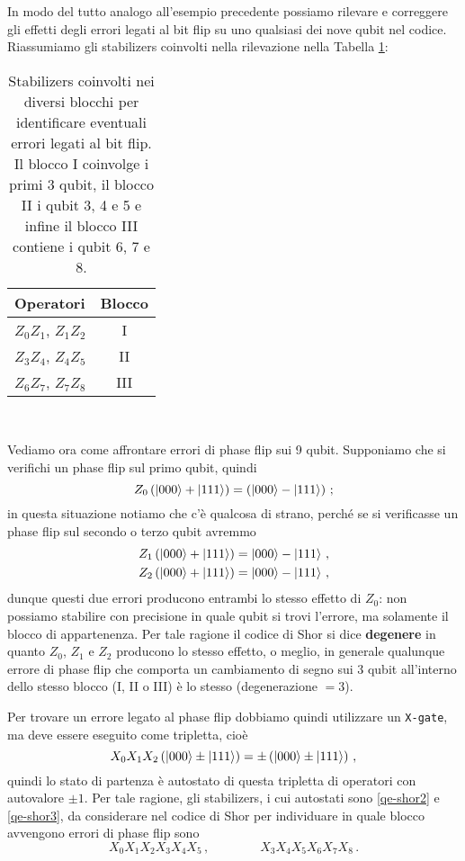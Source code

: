 \noindent In modo del tutto analogo all'esempio precedente possiamo rilevare e correggere gli effetti degli errori legati al bit flip su uno qualsiasi dei nove qubit nel codice. Riassumiamo gli stabilizers coinvolti nella rilevazione nella Tabella \ref{tab:shor-bit-flip-cases}:
\begin{table}[!ht]
	\centering
    \begin{tabular}{lc}
        \toprule
        Operatori & Blocco \\
        \midrule
        $Z_0Z_1$, $Z_1Z_2$ & I \\
        $Z_3Z_4$, $Z_4Z_5$ & II \\
        $Z_6Z_7$, $Z_7Z_8$ & III \\
        \bottomrule
    \end{tabular}\\
    \caption{Stabilizers coinvolti nei diversi blocchi per identificare eventuali errori legati al bit flip. Il blocco I coinvolge i primi 3 qubit, il blocco II i qubit 3, 4 e 5 e infine il blocco III contiene i qubit 6, 7 e 8.}
    \label{tab:shor-bit-flip-cases}
\end{table}

\noindent Vediamo ora come affrontare errori di phase flip sui 9 qubit. Supponiamo che si verifichi un phase flip sul primo qubit, quindi
\begin{equation*}
    Z_0\left(\ket{000}+\ket{111}\right)=\left(\ket{000}-\ket{111}\right) \, ;
\end{equation*}
in questa situazione notiamo che c'è qualcosa di strano, perché se si verificasse un phase flip sul secondo o terzo qubit avremmo 
\begin{align*}
    Z_1\left(\ket{000}+\ket{111}\right) &= \ket{000}-\ket{111} \, , \\
    Z_2\left(\ket{000}+\ket{111}\right) &= \ket{000}-\ket{111} \, ,
\end{align*}
dunque questi due errori producono entrambi lo stesso effetto di $Z_0$: non possiamo stabilire con precisione in quale qubit si trovi l'errore, ma solamente il blocco di appartenenza. Per tale ragione il codice di Shor si dice \textbf{degenere} in quanto $Z_0$, $Z_1$ e $Z_2$ producono lo stesso effetto, o meglio, in generale qualunque errore di phase flip che comporta un cambiamento di segno sui 3 qubit all'interno dello stesso blocco (I, II o III) è lo stesso (degenerazione $= 3$). 

\noindent Per trovare un errore legato al phase flip dobbiamo quindi utilizzare un \texttt{X-gate}, ma deve essere eseguito come tripletta, cioè
\begin{equation*}
    X_0X_1X_2\left(\ket{000}\pm\ket{111}\right)= \pm \left( \ket{000} \pm \ket{111} \right) \, ,
\end{equation*}
quindi lo stato di partenza è autostato di questa tripletta di operatori con autovalore $\pm 1$. Per tale ragione, gli stabilizers, i cui autostati sono \eqref{qe-shor2} e \eqref{qe-shor3}, da considerare nel codice di Shor per individuare in quale blocco avvengono errori di phase flip sono
\begin{equation}\label{X_stabilizers}
    X_0X_1X_2X_3X_4X_5 \, , \qquad \qquad X_3X_4X_5X_6X_7X_8 \, .
\end{equation}
 

